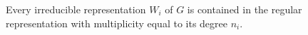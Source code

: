 Every irreducible representation $W_i$ of $G$ is contained in the regular representation with multiplicity equal to its degree $n_i$.
